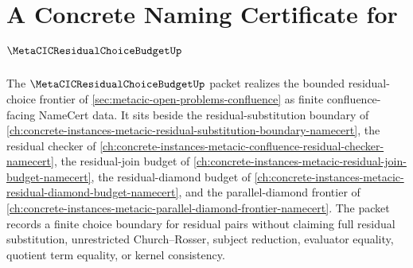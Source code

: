 \chapter{A Concrete Naming Certificate for $\MetaCICResidualChoiceBudgetUp$}
\label{ch:concrete-instances-metacic-residual-choice-budget-namecert}

The $\MetaCICResidualChoiceBudgetUp$ packet realizes the bounded residual-choice frontier of \autoref{sec:metacic-open-problems-confluence} as finite confluence-facing NameCert data. It sits beside the residual-substitution boundary of \autoref{ch:concrete-instances-metacic-residual-substitution-boundary-namecert}, the residual checker of \autoref{ch:concrete-instances-metacic-confluence-residual-checker-namecert}, the residual-join budget of \autoref{ch:concrete-instances-metacic-residual-join-budget-namecert}, the residual-diamond budget of \autoref{ch:concrete-instances-metacic-residual-diamond-budget-namecert}, and the parallel-diamond frontier of \autoref{ch:concrete-instances-metacic-parallel-diamond-frontier-namecert}. The packet records a finite choice boundary for residual pairs without claiming full residual substitution, unrestricted Church--Rosser, subject reduction, evaluator equality, quotient term equality, or kernel consistency.



